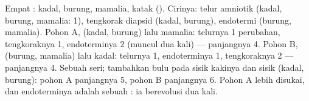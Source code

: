 \begin{example}\label{ex:b1:classifying-biodiversity:count}
Empat : kadal, burung, mamalia, katak (). Cirinya:
telur amniotik (kadal, burung, mamalia: 1), tengkorak diapsid (kadal,
burung), endotermi (burung, mamalia). Pohon A, (kadal, burung) lalu
mamalia: telurnya 1 perubahan, tengkoraknya 1, endoterminya 2 (muncul
dua kali) --- panjangnya 4. Pohon B, (burung, mamalia) lalu kadal:
telurnya 1, endoterminya 1, tengkoraknya 2 --- panjangnya 4. Sebuah
seri; tambahkan bulu pada sisik kakinya dan sisik  (kadal,
burung): pohon A panjangnya 5, pohon B panjangnya 6. Pohon A lebih
disukai, dan endoterminya adalah sebuah : ia berevolusi dua
kali.
\end{example}

